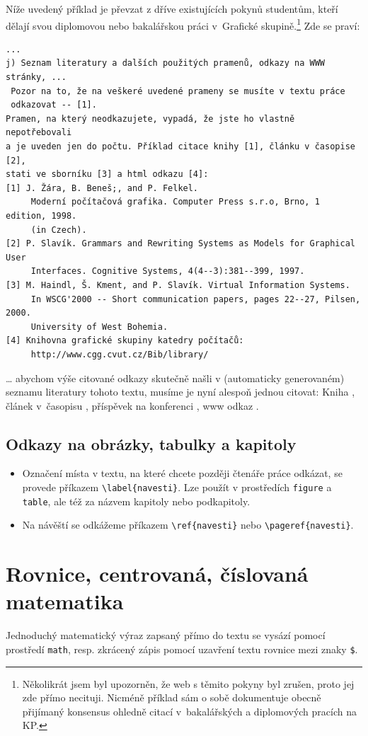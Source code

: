 \documentclass[11pt,twoside,a4paper]{book}
\begin{document}
Níže uvedený příklad je převzat z dříve existujících pokynů studentům, kteří 
dělají svou diplomovou nebo bakalářskou práci v~Grafické skupině.\footnote{Několikrát 
jsem byl upozorněn, že web s těmito pokyny byl zrušen, proto jej zde přímo necituji. 
Nicméně příklad sám o sobě dokumentuje obecně přijímaný konsensus ohledně citací 
v~bakalářských a diplomových pracích na KP.} Zde se praví:
\begin{small}
\begin{verbatim}
...
j) Seznam literatury a dalších použitých pramenů, odkazy na WWW stránky, ...
 Pozor na to, že na veškeré uvedené prameny se musíte v textu práce 
 odkazovat -- [1]. 
Pramen, na který neodkazujete, vypadá, že jste ho vlastně nepotřebovali 
a je uveden jen do počtu. Příklad citace knihy [1], článku v časopise [2], 
stati ve sborníku [3] a html odkazu [4]: 
[1] J. Žára, B. Beneš;, and P. Felkel. 
     Moderní počítačová grafika. Computer Press s.r.o, Brno, 1 edition, 1998. 
     (in Czech). 
[2] P. Slavík. Grammars and Rewriting Systems as Models for Graphical User 
     Interfaces. Cognitive Systems, 4(4--3):381--399, 1997. 
[3] M. Haindl, Š. Kment, and P. Slavík. Virtual Information Systems. 
     In WSCG'2000 -- Short communication papers, pages 22--27, Pilsen, 2000. 
     University of West Bohemia. 
[4] Knihovna grafické skupiny katedry počítačů: 
     http://www.cgg.cvut.cz/Bib/library/ 
\end{verbatim}
\end{small}
\ldots{} abychom výše citované odkazy skutečně našli v (automaticky generovaném) seznamu literatury tohoto textu, musíme je nyní alespoň jednou citovat: Kniha \cite{kniha}, článek v~časopisu \cite{clanek}, příspěvek na konferenci \cite{sbornik}, www odkaz \cite{www}.

\subsection{Odkazy na obrázky, tabulky a kapitoly}
\begin{itemize}
\item Označení místa v textu, na které chcete později čtenáře práce odkázat, se provede příkazem \verb|\label{navesti}|. Lze použít v prostředích \verb|figure| a  \verb|table|, ale též za názvem kapitoly nebo podkapitoly.
\item Na návěští se odkážeme příkazem \verb|\ref{navesti}| nebo \verb|\pageref{navesti}|.
\end{itemize}

\section{Rovnice, centrovaná, číslovaná matematika}
Jednoduchý matematický výraz zapsaný přímo do textu se vysází pomocí prostředí \verb|math|, resp. zkrácený zápis pomocí uzavření textu rovnice mezi znaky \verb|$|.
\end{document}
